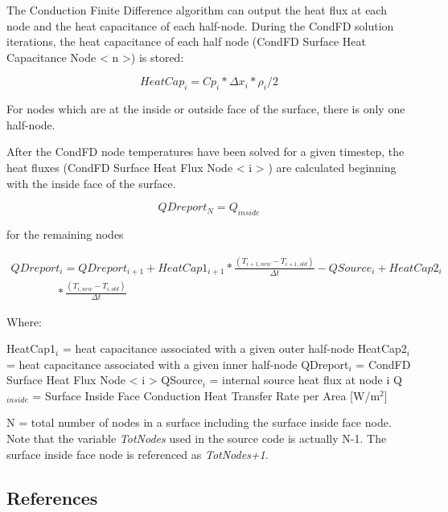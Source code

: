 The Conduction Finite Difference algorithm can output the heat flux at each node and the heat capacitance of each half-node. During the CondFD solution iterations, the heat capacitance of each half node (CondFD Surface Heat Capacitance Node \textless{} n \textgreater{}) is stored:

\begin{equation}
{HeatCap_{i} = Cp_{i}*\Delta x_{i}*\rho_{i}/2}
\end{equation}

For nodes which are at the inside or outside face of the surface, there is only one half-node.

After the CondFD node temperatures have been solved for a given timestep, the heat fluxes (CondFD Surface Heat Flux Node \textless{} i \textgreater{} ) are calculated beginning with the inside face of the surface.

\begin{equation}
{QDreport_{N} = Q_{inside}}
\end{equation}

for the remaining nodes

\begin{equation}
\begin{array}{l}
QDreport_{i} = QDreport_{i+1}+HeatCap1_{i+1}* \frac{\left(T_{i+1,new}-T_{i+1,old}\right)}{\Delta t}-QSource_{i}+HeatCap2_{i} \\
\quad \quad \quad \quad * \frac{\left(T_{i,new}-T_{i,old}\right)}{\Delta t}
\end{array}
\end{equation}

Where:

HeatCap1\(_{i}\) = heat capacitance associated with a given outer half-node HeatCap2\(_{i}\) = heat capacitance associated with a given inner half-node QDreport\(_{i}\) = CondFD Surface Heat Flux Node \textless{} i \textgreater{} QSource\(_{i}\) = internal source heat flux at node i Q\(_{inside}\) = Surface Inside Face Conduction Heat Transfer Rate per Area {[}W/m\(^{2}\){]}

N = total number of nodes in a surface including the surface inside face node. Note that the variable \emph{TotNodes} used in the source code is actually N-1. The surface inside face node is referenced as \emph{TotNodes+1}.

\subsection{References}\label{references-013}


